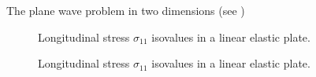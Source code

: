 The plane wave problem in two dimensions (see \cite{DGMPM})%

\begin{figure}[h!]
  \centering
  
  \caption{Longitudinal stress $\sigma_{11}$ isovalues in a linear elastic plate.}
  \label{fig:2dhe_stress}
\end{figure}


\begin{figure}[h!]
  \centering
  
  \caption{Longitudinal stress $\sigma_{11}$ isovalues in a linear elastic plate.}
  \label{fig:2dhe_velo}
\end{figure}

